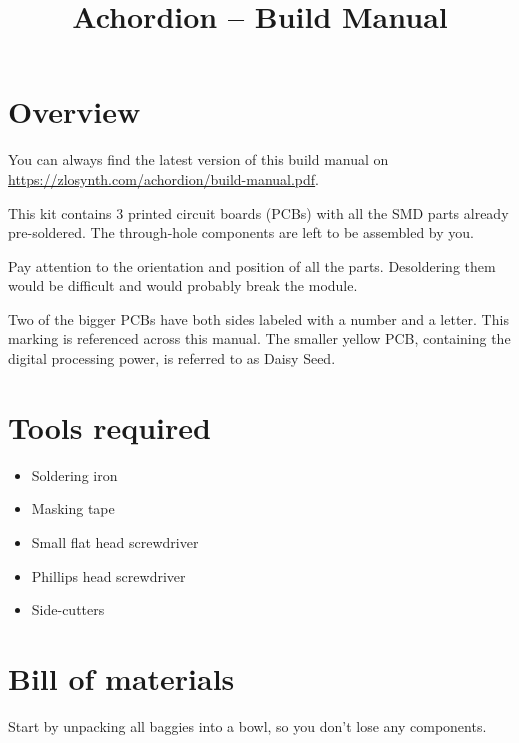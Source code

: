\documentclass[10pt,a4paper,twocolumn]{article}
\begin{document}
\title{Achordion -- Build Manual}
\author{}
\date{}

\maketitle

\section{Overview}

You can always find the latest version of this build manual on
\url{https://zlosynth.com/achordion/build-manual.pdf}.

This kit contains 3 printed circuit boards (PCBs) with all the SMD parts already
pre-soldered. The through-hole components are left to be assembled by you.

Pay attention to the orientation and position of all the parts. Desoldering
them would be difficult and would probably break the module.

Two of the bigger PCBs have both sides labeled with a number and a letter. This
marking is referenced across this manual. The smaller yellow PCB, containing the
digital processing power, is referred to as Daisy Seed.

\newpage

\section{Tools required}

\begin{itemize}
  \item Soldering iron
  \item Masking tape
  \item Small flat head screwdriver
  \item Phillips head screwdriver
  \item Side-cutters
\end{itemize}

\newpage

\section{Bill of materials}

Start by unpacking all baggies into a bowl, so you don't lose any components.
\end{document}

